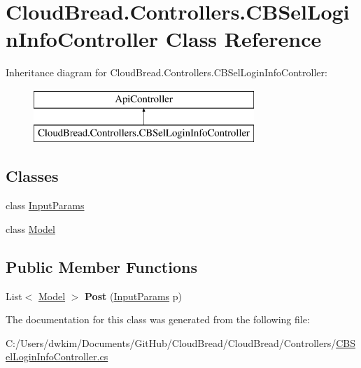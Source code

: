 \hypertarget{a00051}{}\section{Cloud\+Bread.\+Controllers.\+C\+B\+Sel\+Login\+Info\+Controller Class Reference}
\label{a00051}
Inheritance diagram for Cloud\+Bread.\+Controllers.\+C\+B\+Sel\+Login\+Info\+Controller\+:\begin{figure}[H]
\begin{center}
\leavevmode
\includegraphics[height=2.000000cm]{a00051}
\end{center}
\end{figure}
\subsection*{Classes}
\begin{DoxyCompactItemize}
\item 
class \hyperlink{a00093}{Input\+Params}
\item 
class \hyperlink{a00150}{Model}
\end{DoxyCompactItemize}
\subsection*{Public Member Functions}
\begin{DoxyCompactItemize}
\item 
List$<$ \hyperlink{a00150}{Model} $>$ {\bfseries Post} (\hyperlink{a00093}{Input\+Params} p)\hypertarget{a00051_ae6dca0c99340f8f6583f2726966e8da2}{}\label{a00051_ae6dca0c99340f8f6583f2726966e8da2}

\end{DoxyCompactItemize}


The documentation for this class was generated from the following file\+:\begin{DoxyCompactItemize}
\item 
C\+:/\+Users/dwkim/\+Documents/\+Git\+Hub/\+Cloud\+Bread/\+Cloud\+Bread/\+Controllers/\hyperlink{a00222}{C\+B\+Sel\+Login\+Info\+Controller.\+cs}\end{DoxyCompactItemize}
